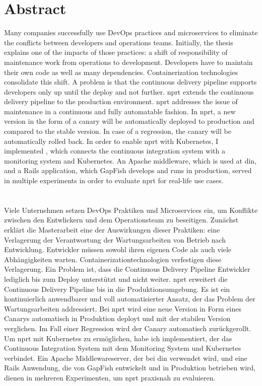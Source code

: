 \section*{Abstract}
Many companies successfully use DevOps practices and microservices to eliminate the
conflicts between developers and operations teams. Initially, the thesis explains one
of the impacts of those practices: a shift of responsibility of maintenance work from
operations to development. Developers have to maintain their own code as well as many
dependencies. Containerization technologies consolidate this shift. A problem is that the
continuous delivery pipeline supports developers only up until the deploy and not
further. \gls{nprt} extends the continuous delivery pipeline to the production
environment. \gls{nprt} addresses the issue of maintenance in a continuous and fully automatable
fashion. In \gls{nprt}, a new version in the form of a canary will be automatically deployed
to production and compared to the stable version. In case of a regression, the canary will
be automatically rolled back. In order to enable \gls{nprt} with Kubernetes, I implemented
\deployer, which connects the continuous integration system with a monitoring system and
Kubernetes. An Apache middleware, which is used at \gls{din}, and a Rails application,
which GapFish develops and runs in production, served in multiple experiments in order to
evaluate \gls{nprt} for real-life use cases.
\\\\\\
Viele Unternehmen setzen DevOps Praktiken und Microservices ein, um Konflikte zwischen den
Entwlickern und dem Operationsteam zu beseitigen. Zunächst erklärt die Masterarbeit eine
der Auswirkungen dieser Praktiken: eine Verlagerung der Verantwortung der Wartungsarbeiten
von Betrieb nach Entwicklung. Entwickler müssen sowohl ihren eigenen Code als auch viele
Abhängigkeiten warten. Containerizationtechnologien verfestigen diese Verlagerung. Ein
Problem ist, dass die Continuous Delivery Pipeline Entwickler lediglich bis zum Deploy
unterstützt und nicht weiter. \gls{nprt} erweitert die Continuous Delivery Pipeline bis in
die Produktionsumgebung. Es ist ein kontinuierlich anwendbarer und voll automatisierter
Ansatz, der das Problem der Wartungsarbeiten addressiert. Bei \gls{nprt} wird eine neue
Version in Form eines Canarys automatisch in Produktion deployt und mit der stabilen
Version verglichen. Im Fall einer Regression wird der Canary automatisch zurückgerollt. Um
\gls{nprt} mit Kubernetes zu ermöglichen, habe ich \deployer implementiert, der das
Continuous Integration System mit dem Monitoring System und Kubernetes verbindet. Ein
Apache Middlewareserver, der bei \gls{din} verwendet wird, und eine Rails Anwendung, die
von GapFish entwickelt und in Produktion betrieben wird, dienen in mehreren Experimenten,
um \gls{nprt} praxisnah zu evaluieren.
